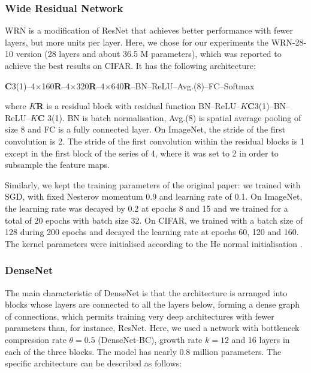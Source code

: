 {\subsubsection{Wide Residual Network}
WRN is a modification of ResNet \citep{he2016resnet} that achieves better performance with fewer layers, but more units per layer. Here, we chose for our experiments the WRN-28-10 version (28 layers and about 36.5 M parameters), which was reported to achieve the best results on CIFAR. It has the following architecture:

\begin{center}
\textbf{C}3(1)--4$\times$160\textbf{R}--4$\times$320\textbf{R}--4$\times$640\textbf{R}--BN--ReLU--Avg.(8)--FC--Softmax
\end{center}
%
where $K$\textbf{R} is a residual block with residual function  BN--ReLU--$K$\textbf{C}3(1)--BN--ReLU--$K$\textbf{C} 3(1). BN is batch normalisation, Avg.(8) is spatial average pooling of size 8 and FC is a fully connected layer. On ImageNet, the stride of the first convolution is 2. The stride of the first convolution within the residual blocks is 1 except in the first block of the series of 4, where it was set to 2 in order to subsample the feature maps. 

Similarly, we kept the training parameters of the original paper: we trained with SGD, with fixed Nesterov momentum 0.9 and learning rate of 0.1. On ImageNet, the learning rate was decayed by 0.2 at epochs 8 and 15 and we trained for a total of 20 epochs with batch size 32. On CIFAR, we trained with a batch size of 128 during 200 epochs and decayed the learning rate at epochs 60, 120 and 160. The kernel parameters were initialised according to the He normal initialisation \citep{he2015he}.

\subsubsection{DenseNet}

The main characteristic of DenseNet \citep{huang2017densenet} is that the architecture is arranged into blocks whose layers are connected to all the layers below, forming a dense graph of connections, which permits training very deep architectures with fewer parameters than, for instance, ResNet. Here, we used a network with bottleneck compression rate $\theta = 0.5$ (DenseNet-BC), growth rate $k = 12$ and 16 layers in each of the three blocks. The model has nearly 0.8 million parameters. The specific architecture can be described as follows:

}
